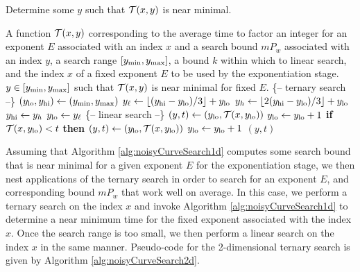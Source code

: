 \documentclass{ucalgthes1}
\theoremstyle{definition}
\newcommand{\floor}[1]{\left\lfloor #1 \right\rfloor}
\begin{document}
\begin{algorithm}[htb]
\caption[Subroutine to Search a Curve in 1-Dimension.]{Determine some $y$ such that $\mathcal T(x, y)$ is near minimal.}
\label{alg:noisyCurveSearch1d}
\begin{algorithmic}[1]
\Require A function $\mathcal T(x, y)$ corresponding to the average time to factor an integer for an exponent $E$ associated with an index $x$ and a search bound $mP_w$ associated with an index $y$,
a search range $[y_{\textrm{min}}, y_{\textrm{max}}]$,
a bound $k$ within which to linear search,
and the index $x$ of a fixed exponent $E$ to be used by the exponentiation stage.
\Ensure $y \in [y_{\textrm{min}}, y_{\textrm{max}}]$ such that $\mathcal T(x, y)$ is near minimal for fixed $E$.
\Statex \{-- ternary search --\}
\State $(y_{\textrm{lo}}, y_{\textrm{hi}}) \gets (y_{\textrm{min}}, y_{\textrm{max}})$
	\State $\yonethird \gets \floor{(\yhi - \ylo) / 3} + \ylo$
	\State $\ytwothird \gets \floor{2(\yhi - \ylo) / 3} + \ylo$
		\State $y_{\textrm{hi}} \gets y_h$
	\Else
		\State $y_{\textrm{lo}} \gets y_\ell$
	\EndIf
\EndWhile
\Statex \{-- linear search --\}
\State $(y, t) \gets (y_{\textrm{lo}}, \mathcal T(x, y_{\textrm{lo}}))$ 
\State $y_{\textrm{lo}} \gets y_{\textrm{lo}} + 1$
\While{$\ylo \le \yhi$}
	\State \textbf{if} $\mathcal T(x, y_{\textrm{lo}}) < t$ \textbf{then} $(y, t) \gets (y_{\textrm{lo}}, \mathcal T(x, y_{\textrm{lo}}))$
	\State $y_{\textrm{lo}} \gets y_{\textrm{lo}} + 1$
\EndWhile
\State \Return $(y, t)$
\EndProcedure
\end{algorithmic}
\end{algorithm}

Assuming that Algorithm \ref{alg:noisyCurveSearch1d} computes some search bound that is near minimal for a given exponent $E$ for the exponentiation stage, we then nest applications of the ternary search in order to search for an exponent $E$, and corresponding bound $mP_w$ that work well on average.  In this case, we perform a ternary search on the index $x$ and invoke Algorithm \ref{alg:noisyCurveSearch1d} to determine a near minimum time for the fixed exponent associated with the index $x$.  Once the search range is too small, we then perform a linear search on the index $x$ in the same manner.  Pseudo-code for the 2-dimensional ternary search is given by Algorithm \ref{alg:noisyCurveSearch2d}.
\end{document}
